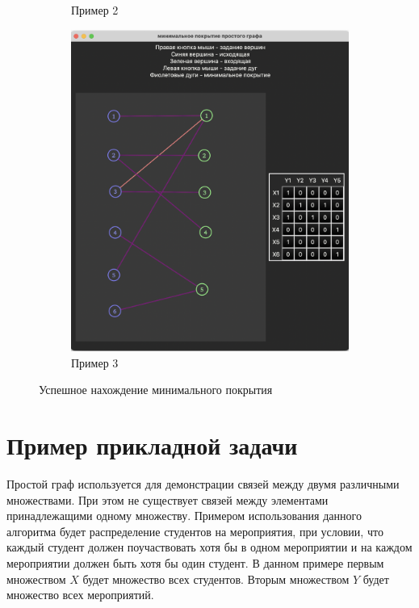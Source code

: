 \documentclass[12pt]{article}
\begin{document}
\begin{figure}[H]
\begin{subfigure}{0.3\textwidth}
        \caption{Пример 2}
        \label{fig:success_example_2}
    \end{subfigure}
    \begin{subfigure}{0.3\textwidth}
        \includegraphics[width=1\textwidth]{screenshot4.png}
        \caption{Пример 3}
        \label{fig:success_example_3}
    \end{subfigure}
    \caption{Успешное нахождение минимального покрытия}
    \label{fig:success_example}
\end{figure}

\section{Пример прикладной задачи}

Простой граф используется для демонстрации связей между двумя
различными множествами. При этом не существует связей между
элементами принадлежащими одному множеству. Примером использования
данного алгоритма будет распределение студентов на мероприятия, при
условии, что каждый студент должен поучаствовать хотя бы в одном
мероприятии и на каждом мероприятии должен быть хотя бы один студент.
В данном примере первым множеством $X$ будет множество всех
студентов. Вторым множеством $Y$ будет множество всех
мероприятий.
\end{document}

